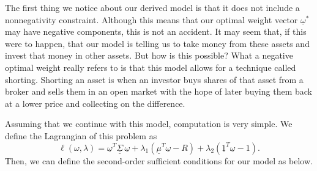 \documentclass{article}
\renewcommand{\vec}[1]{\underline{#1}}
\newcommand{\mat}[1]{\underline{\underline{#1}}}
\theoremstyle{definition}
\begin{document}
The first thing we notice about our derived model is that it does not include a nonnegativity constraint. Although this means that our optimal weight vector $\vec\omega^*$ may have negative components, this is not an accident. It may seem that, if this were to happen, that our model is telling us to take money from these assets and invest that money in other assets. But how is this possible? What a negative optimal weight really refers to is that this model allows for a technique called shorting. Shorting an asset is when an investor buys shares of that asset from a broker and sells them in an open market with the hope of later buying them back at a lower price and collecting on the difference. 

Assuming that we continue with this model, computation is very simple. We define the Lagrangian of this problem as 
$$\ell(\omega, \lambda) = \vec\omega^T \mat\Sigma \, \vec\omega + \lambda_1 (\vec\mu^T \vec\omega - R) + \lambda_2 (\vec 1^T \vec\omega - 1).$$
Then, we can define the second-order sufficient conditions for our model as below.
\end{document}
